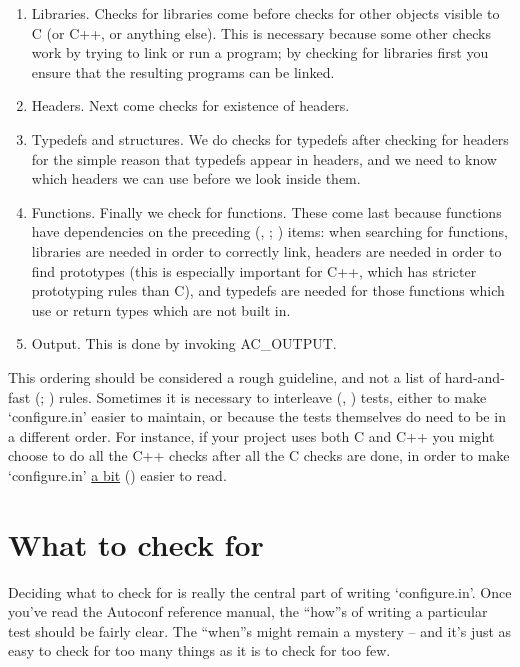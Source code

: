 \begin{enumerate}
\item Libraries. Checks for libraries come before checks for other objects visible to C (or C++, or anything else). This is necessary because some other checks work by trying to link or run a program; by checking for libraries first you ensure that the resulting programs can be linked. 

\item Headers. Next come checks for existence of headers. 

\item Typedefs and structures. We do checks for typedefs after checking for headers for the simple reason that typedefs appear in headers, and we need to know which headers we can use before we look inside them. 

\item Functions. Finally we check for functions. These come last because 
functions have dependencies on the preceding ({\MaQ{}}, {\MaQ{}}; {\MaQ{}}) items:
when searching for functions, libraries are needed in order to correctly 
link, headers are needed in order to find prototypes (this is especially 
important for C++, which has stricter prototyping rules than C), and typedefs 
are needed for those functions which use or return types which are not built in. 

\item Output. This is done by invoking AC\_{}OUTPUT. 
\end{enumerate}

This ordering should be considered a rough guideline, and not a list of 
hard-and-fast ({\MaQ{}}; {\MaQ{}}) rules. Sometimes it is necessary to 
interleave ({\MfQ{}}, {\MfQ{}}) tests, either to make `configure.in' easier to 
maintain, or because the tests themselves do need to be in a different order. For instance, if your project uses both C and C++ you might choose to do all the C++ checks after all the C checks are done, in order to make `configure.in' 
\underline{a bit} ({\MbQ{}}) easier to read. 

\section{What to check for}


Deciding what to check for is really the central part of 
writing `configure.in'. Once you've read the Autoconf reference manual,
the ``how''s of writing a particular test should be fairly clear.
The ``when''s might remain a mystery -- and it's just as easy to check for 
too many things as it is to check for too few. 


